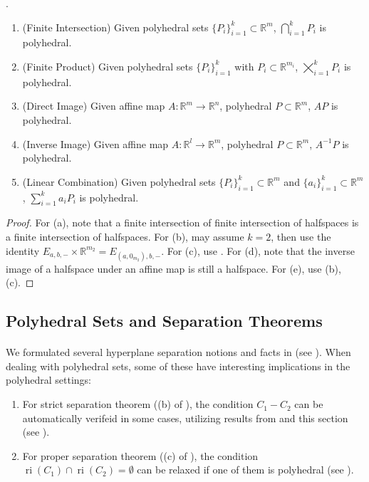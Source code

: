 \begin{prop}\label{prop:017-polyhedral-yoga}.
	\begin{enumerate}[label=(\alph*)]
		\item (Finite Intersection) Given polyhedral sets $\{P_i\}_{i=1}^{k}\subset \mathbb{R}^m$, $\bigcap_{i=1}^kP_i$ is polyhedral.
		\item (Finite Product) Given polyhedral sets $\{P_i\}_{i=1}^{k}$ with $P_i\subset \mathbb{R}^{m_i}$, $\bigtimes_{i=1}^kP_i$ is polyhedral.
		\item (Direct Image) Given affine map $A:\mathbb{R}^m\to \mathbb{R}^n$, polyhedral $P\subset \mathbb{R}^m$, $AP$ is polyhedral.
		\item (Inverse Image) Given affine map $A:\mathbb{R}^l\to \mathbb{R}^m$, polyhedral $P\subset \mathbb{R}^m$, $A^{-1}P$ is polyhedral.
		\item (Linear Combination) Given polyhedral sets $\{P_i\}_{i=1}^{k}\subset \mathbb{R}^m$ and $\{a_i\}_{i=1}^k\subset \mathbb{R}^m$, $\sum_{i=1}^ka_iP_i$ is polyhedral.
	\end{enumerate}
\end{prop}
\begin{proof}
	For (a), note that a finite intersection of finite intersection of halfspaces is a finite intersection of halfspaces. For (b), may assume $k=2$, then use the identity $E_{a,b,-}\times \mathbb{R}^{m_2}=E_{(a,0_{m_2}),b,-}$. For (c), use . For (d), note that the inverse image of a halfspace under an affine map is still a halfspace. For (e), use (b), (c).
\end{proof}

\subsection{Polyhedral Sets and Separation Theorems}

\paragraph{}We formulated several hyperplane separation notions and facts in  (see ). When dealing with polyhedral sets, some of these have interesting implications in the polyhedral settings:

\begin{enumerate}[label=(\arabic*)]
	\item For strict separation theorem ((b) of ), the condition $C_1-C_2$ can be automatically verifeid in some cases, utilizing results from  and this section (see ).
	\item For proper separation theorem ((c) of ), the condition $\operatorname{ri}(C_1)\cap\operatorname{ri}(C_2)=\emptyset$ can be relaxed if one of them is polyhedral (see ).
\end{enumerate}

